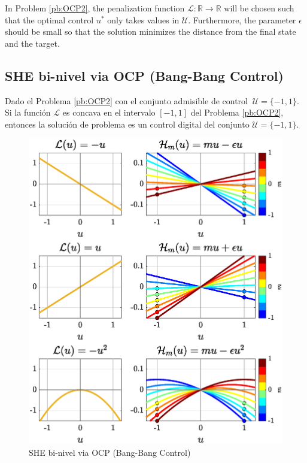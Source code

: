 In Problem \ref{pb:OCP2}, the penalization function $\mathcal L: \mathbb{R} \rightarrow \mathbb{R}$ will be chosen such that the optimal control $u^*$ only takes values in $\mathcal U$. Furthermore, the parameter $\epsilon$ should be small so that the solution minimizes the distance from the final state and the target.



\subsection{SHE bi-nivel via OCP (Bang-Bang Control)} 

\begin{theorem}\label{th:bang-bang}
    Dado el Problema \ref{pb:OCP2} con el conjunto admisible de control $ \ \mathcal{U} = \{-1,1\}$. Si la función $\mathcal{L}$ es concava en el intervalo $[-1,1]$ del Problema \ref{pb:OCP2}, entonces la solución de problema es un control digital del conjunto $\mathcal{U} =  \{-1,1\}$.
\end{theorem}

\begin{figure} 
    \centering
    \includegraphics[scale=0.415]{img/fig03.eps}
    \caption{SHE bi-nivel via OCP (Bang-Bang Control)}
\end{figure}
